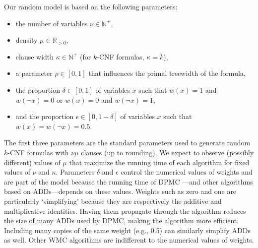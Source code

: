 Our random model is based on the following parameters:
\begin{itemize}
\item the number of variables $\nu \in \mathbb{N}^+$,
\item density $\mu \in \mathbb{R}_{>0}$,
\item clause width $\kappa \in \mathbb{N}^+$ (for $k$-CNF formulas, $\kappa =
  k$),
\item a parameter $\rho \in [0, 1]$ that influences the primal treewidth of
  the formula,
\item the proportion $\delta \in [0, 1]$ of variables $x$ such that $w(x) = 1$
  and $w(\neg x) = 0$ or $w(x) = 0$ and $w(\neg x) = 1$,
\item and the proportion $\epsilon \in [0, 1-\delta]$ of variables $x$ such that
  $w(x) = w(\neg x) = 0.5$.
\end{itemize}
The first three parameters are the standard parameters used to generate random
$k$-CNF formulas with $\nu\mu$ clauses (up to rounding). We expect to observe
(possibly different) values of $\mu$ that maximize the running time of each
algorithm for fixed values of $\nu$ and $\kappa$. Parameters $\delta$ and
$\epsilon$ control the numerical values of weights and are part of the model
because the running time of \textsc{DPMC} \citep{DBLP:conf/cp/DudekPV20}---and
other algorithms based on ADDs---depends on these values. Weights such as zero
and one are particularly `simplifying' because they are respectively the
additive and multiplicative identities. Having them propagate through the
algorithm reduces the size of many ADDs used by \textsc{DPMC}, making the
algorithm more efficient. Including many copies of the same weight (e.g., 0.5)
can similarly simplify ADDs as well. Other \textsf{WMC} algorithms are
indifferent to the numerical values of weights.

